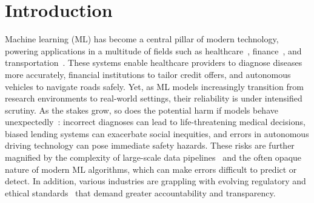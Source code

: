




\chapter{Introduction}
\label{ch:introduction}

\noindent Machine learning (ML) has become a central pillar of modern technology, powering applications in a multitude of fields such as healthcare~\citep{kotropoulos2009linear,sousa2009ordinal, challen2019artificial,guan2020bounded, mozannar2020consistent}, finance~\citep{9260038}, and transportation~\citep{ghodsi2021generating, tselentis2023usefulness}. These systems enable healthcare providers to diagnose diseases more accurately, financial institutions to tailor credit offers, and autonomous vehicles to navigate roads safely. Yet, as ML models increasingly transition from research environments to real-world settings, their reliability is under intensified scrutiny. As the stakes grow, so does the potential harm if models behave unexpectedly~\citep{amodei2016concrete, wiens2019no}: incorrect diagnoses can lead to life-threatening medical decisions, biased lending systems can exacerbate social inequities, and errors in autonomous driving technology can pose immediate safety hazards. These risks are further magnified by the complexity of large-scale data pipelines~\citep{pervaiz2019examining} and the often opaque nature of modern ML algorithms, which can make errors difficult to predict or detect. In addition, various industries are grappling with evolving regulatory and ethical standards~\citep{lo2020ethical, yaghini2024regulation} that demand greater accountability and transparency. %



